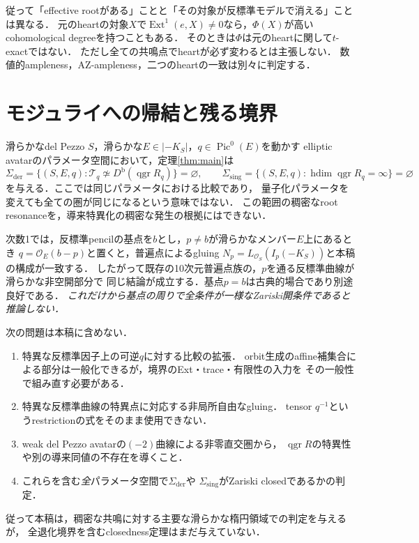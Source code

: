 \documentclass[11pt,a4paper]{ltjsarticle}
\theoremstyle{definition}
\newcommand{\OO}{\mathcal O}
\newcommand{\TT}{\mathcal T}
\newcommand{\Db}{D^{\mathrm b}}
\newcommand{\Ext}{\operatorname{Ext}}
\newcommand{\qgr}{\operatorname{qgr}}
\newcommand{\Pic}{\operatorname{Pic}}
\begin{document}
従って「effective rootがある」ことと「その対象が反標準モデルで消える」ことは異なる．
元のheartの対象$X$で$\Ext^1(e,X)\ne0$なら，$\Phi(X)$が高いcohomological degreeを持つこともある．
そのときは$\Phi$は元のheartに関して$t$-exactではない．
ただし全ての共鳴点でheartが必ず変わるとは主張しない．
数値的ampleness，AZ-ampleness，二つのheartの一致は別々に判定する．



\section{モジュライへの帰結と残る境界}\label{sec:limits}
滑らかなdel Pezzo $S$，滑らかな$E\in|-K_S|$，$q\in\Pic^0(E)$を動かす
elliptic avatarのパラメータ空間において，定理\ref{thm:main}は
\[
 \Sigma_{\mathrm{der}}
 =\{(S,E,q):\TT_q\not\simeq\Db(\qgr R_q)\}=\varnothing,
 \qquad
 \Sigma_{\mathrm{sing}}
 =\{(S,E,q):\operatorname{hdim}\qgr R_q=\infty\}=\varnothing
\]
を与える．ここでは同じパラメータにおける比較であり，
量子化パラメータを変えても全ての圏が同じになるという意味ではない．
この範囲の稠密なroot resonanceを，導来特異化の稠密な発生の根拠にはできない．

次数1では，反標準pencilの基点を$b$とし，$p\ne b$が滑らかなメンバー$E$上にあるとき
$q=\OO_E(b-p)$と置くと，普遍点によるgluing
$N_p=L_{\OO_S}(I_p(-K_S))$と本稿の構成が一致する．
したがって既存の10次元普遍点族の，$p$を通る反標準曲線が滑らかな非空開部分で
同じ結論が成立する．基点$p=b$は古典的場合であり別途良好である．
\emph{これだけから基点の周りで全条件が一様なZariski開条件であると推論しない．}

次の問題は本稿に含めない．
\begin{enumerate}
\item 特異な反標準因子上の可逆$q$に対する比較の拡張．
  orbit生成のaffine補集合による部分は一般化できるが，境界のExt・trace・有限性の入力を
  その一般性で組み直す必要がある．
\item 特異な反標準曲線の特異点に対応する非局所自由なgluing．
  tensor $q^{-1}$というrestrictionの式をそのまま使用できない．
\item weak del Pezzo avatarの$(-2)$曲線による非零直交圏から，
  $\qgr R$の特異性や別の導来同値の不存在を導くこと．
\item これらを含む\emph{全}パラメータ空間で$\Sigma_{\mathrm{der}}$や
  $\Sigma_{\mathrm{sing}}$がZariski closedであるかの判定．
\end{enumerate}
従って本稿は，稠密な共鳴に対する主要な滑らかな楕円領域での判定を与えるが，
全退化境界を含むclosedness定理はまだ与えていない．
\end{document}

